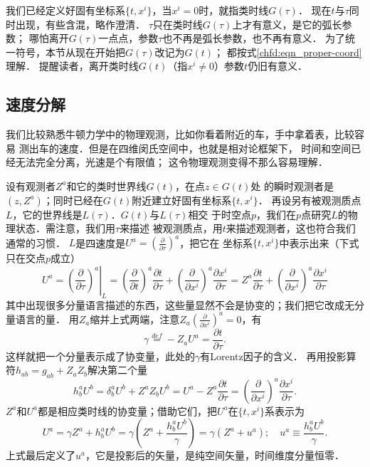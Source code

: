 我们已经定义好固有坐标系$\{t,x^i\}$，当$x^i=0$时，就指类时线$G(\tau)$．
现在$t$与$\tau$同时出现，有些含混，略作澄清．
$\tau$只在类时线$G(\tau)$上才有意义，是它的弧长参数；
哪怕离开$G(\tau)$一点点，参数$\tau$也不再是弧长参数，也不再有意义．
为了统一符号，本节从现在开始把$G(\tau)$改记为$G(t)$；
都按式\eqref{chfd:eqn_proper-coord}理解．
提醒读者，离开类时线$G(t)$（指$x^i \neq 0$）参数$t$仍旧有意义．


\subsection{速度分解}

我们比较熟悉牛顿力学中的物理观测，比如你看着附近的车，手中拿着表，比较容易
测出车的速度．但是在四维闵氏空间中，也就是相对论框架下，
时间和空间已经无法完全分离，光速是个有限值；
这令物理观测变得不那么容易理解．

设有观测者$Z^a$和它的类时世界线$G(t)$，在点$z\in G(t)$处
的瞬时观测者是$(z,Z^a)$；同时已经在$G(t)$附近建立好固有坐标系$\{t,x^i\}$．
再设另有被观测质点$L$，它的世界线是$L(\tau)$．$G(t)$与$L(\tau)$相交
于时空点$p$，我们在$p$点研究$L$的物理状态．需注意，我们用$\tau$来描述
被观测质点，用$t$来描述观测者，这也符合我们通常的习惯．
$L$是四速度是$U^a=(\frac{\partial}{\partial \tau})^a$，把它在
坐标系$\{t,x^i\}$中表示出来（下式只在交点$p$成立）
\begin{equation}
    U^a=\left.\left(\frac{\partial}{\partial \tau}\right)^a\right|_{L}
    =\left(\frac{\partial}{\partial t}\right)^a \frac{\partial t}{\partial \tau}
    +\left(\frac{\partial}{\partial x^i}\right)^a \frac{\partial x^i}{\partial \tau}
    =Z^a \frac{\partial t}{\partial \tau}
    +\left(\frac{\partial}{\partial x^i}\right)^a \frac{\partial x^i}{\partial \tau} 
\end{equation}
其中出现很多分量语言描述的东西，这些量显然不会是协变的；我们把它改成无分量语言的量．
用$Z_a$缩并上式两端，注意$Z_a (\frac{\partial}{\partial x^i})^a =0$，有
\begin{equation}
    \gamma \overset{def}{=} -Z_a U^a = \frac{\partial t}{\partial \tau}.
\end{equation}
这样就把一个分量表示成了协变量，此处的$\gamma$有Lorentz因子的含义．
再用投影算符$h_{ab}=g_{ab}+Z_a Z_b$解决第二个量
\begin{equation}
    h_{b}^a U^b = \delta^a_b U^b + Z^a Z_b U^b
    = U^a - Z^a\frac{\partial t}{\partial \tau}
    = \left(\frac{\partial}{\partial x^i}\right)^a \frac{\partial x^i}{\partial \tau}.
\end{equation}
$Z^a$和$U^a$都是相应类时线的协变量；借助它们，把$U^a$在$\{t,x^i\}$系表示为
\begin{equation}\label{chfd:eqn_UZu}
    U^a = \gamma Z^a + h_{b}^a U^b = \gamma \left(Z^a + \frac{h_{b}^a U^b}{\gamma} \right)
    =\gamma \left(Z^a + u^a \right);\quad u^a\equiv \frac{h_{b}^a U^b}{\gamma}.
\end{equation}
上式最后定义了$u^a$，它是投影后的矢量，是纯空间矢量，时间维度分量恒零．

